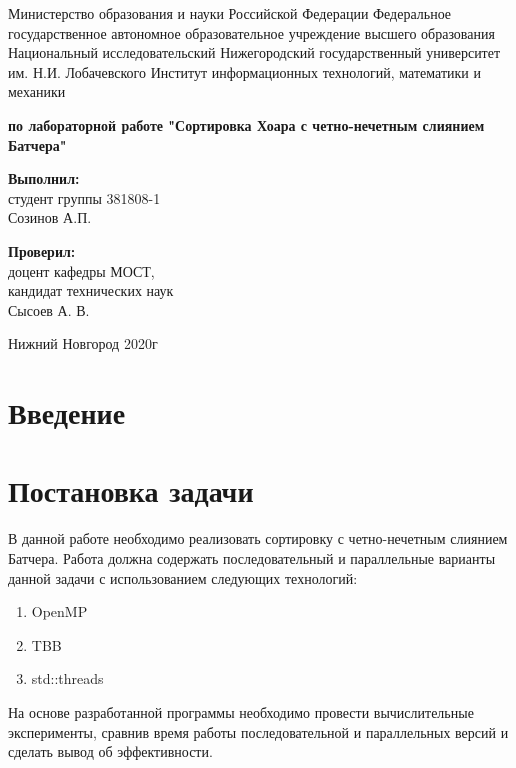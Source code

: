\documentclass{report}
\begin{document}
\begin{titlepage}

\begin{center}Министерство образования и науки Российской Федерации 
Федеральное государственное автономное образовательное учреждение 
высшего образования \\ Национальный исследовательский 
Нижегородский государственный университет им. Н.И. Лобачевского 
Институт информационных технологий, математики и механики

\vspace{8em}
\textbf{ по лабораторной работе "Сортировка Хоара с четно-нечетным слиянием Батчера"} \end{center}

\vspace{8em}

\begin{flushright}  \textbf{Выполнил:} \\ студент группы 381808-1  \\ Созинов А.П. \end{flushright}
\begin{flushright}  \textbf{Проверил:}  \\ доцент кафедры МОСТ, \\ кандидат технических наук \\ Сысоев А. В.\\ \end{flushright}

\vspace{\fill}
\begin{center} Нижний Новгород  2020г \end{center}
\end{titlepage}

\setcounter{page}{2}

\tableofcontents

\newpage
\section*{Введение}


\newpage
\section*{Постановка задачи}
\par В данной работе необходимо реализовать сортировку с четно-нечетным слиянием Батчера.
Работа должна содержать последовательный и параллельные варианты данной 
задачи с использованием следующих технологий:
\begin{enumerate}
\item OpenMP
\item TBB
\item std::threads
\end{enumerate}
\par На основе разработанной программы необходимо провести вычислительные эксперименты, сравнив
время работы последовательной и параллельных версий и сделать вывод об эффективности.
\end{document}
